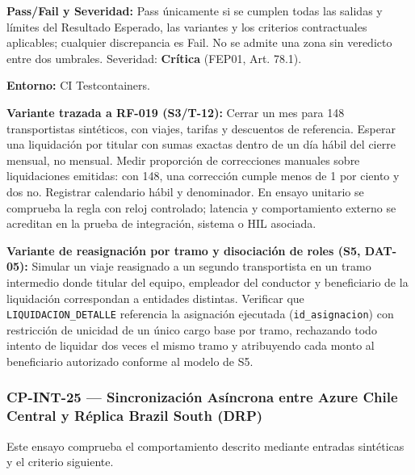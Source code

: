 \par\noindent\textbf{Pass/Fail y Severidad:} Pass únicamente si se cumplen todas las salidas y límites del Resultado Esperado, las variantes y los criterios contractuales aplicables; cualquier discrepancia es Fail. No se admite una zona sin veredicto entre dos umbrales. Severidad: \textbf{Crítica} (FEP01, Art. 78.1).\par
\par\noindent\textbf{Entorno:} CI Testcontainers.\par







\par\noindent\textbf{Variante trazada a RF-019 (S3/T-12):} Cerrar un mes para 148 transportistas sintéticos, con viajes, tarifas y descuentos de referencia. Esperar una liquidación por titular con sumas exactas dentro de un día hábil del cierre mensual, no mensual. Medir proporción de correcciones manuales sobre liquidaciones emitidas: con 148, una corrección cumple menos de 1 por ciento y dos no. Registrar calendario hábil y denominador. En ensayo unitario se comprueba la regla con reloj controlado; latencia y comportamiento externo se acreditan en la prueba de integración, sistema o HIL asociada.\par

\par\noindent\textbf{Variante de reasignación por tramo y disociación de roles (S5, DAT-05):} Simular un viaje reasignado a un segundo transportista en un tramo intermedio donde titular del equipo, empleador del conductor y beneficiario de la liquidación correspondan a entidades distintas. Verificar que \texttt{LIQUIDACION\_DETALLE} referencia la asignación ejecutada (\texttt{id\_asignacion}) con restricción de unicidad de un único cargo base por tramo, rechazando todo intento de liquidar dos veces el mismo tramo y atribuyendo cada monto al beneficiario autorizado conforme al modelo de S5.\par
\subsubsection*{CP-INT-25 — Sincronización Asíncrona entre Azure Chile Central y Réplica Brazil South (DRP)}\label{sec:9-cp-int-25}
Este ensayo comprueba el comportamiento descrito mediante entradas sintéticas y el criterio siguiente.

